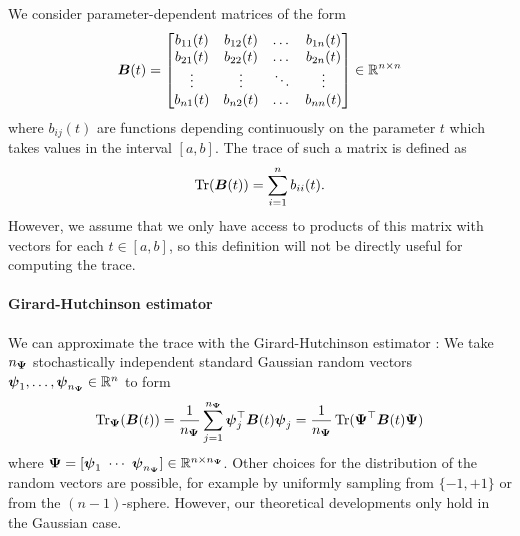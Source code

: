 \documentclass[12pt]{article}
\begin{document}
We consider parameter-dependent matrices of the form
\begin{equation}
    \boldsymbol{B}(t) = \begin{bmatrix}
        b_{11}(t) & b_{12}(t) & \dots & b_{1n}(t) \\
        b_{21}(t) & b_{22}(t) & \dots & b_{2n}(t) \\
        \vdots & \vdots & \ddots & \vdots \\
        b_{n1}(t) & b_{n2}(t) & \dots & b_{nn}(t) \\
    \end{bmatrix} \in \mathbb{R}^{n \times n}
\end{equation}
where $b_{ij}(t)$ are functions depending continuously on the parameter $t$ which takes values in the interval $[a,b]$. The trace of such a matrix is defined as
\begin{equation}
    \operatorname{Tr}(\boldsymbol{B}(t)) = \sum_{i=1}^{n} b_{ii}(t).
    \label{equ:definition-trace}
\end{equation}
However, we assume that we only have access to products of this matrix with vectors for each $t \in [a, b]$, so this definition will not be directly useful for computing the trace.

\paragraph{Girard-Hutchinson estimator} We can approximate the trace with the Girard-Hutchinson estimator \cite{girard-1989-fast-montecarlo,hutchinson-1990-stochastic-estimator}: We take $n_{\boldsymbol{\Psi}}$ stochastically independent standard Gaussian random vectors $\boldsymbol{\psi}_1,\dots, \boldsymbol{\psi}_{n_{\boldsymbol{\Psi}}} \in \mathbb{R}^{n}$ to form
\begin{equation}
    \operatorname{Tr}_{\boldsymbol{\Psi}}(\boldsymbol{B}(t))
    = \frac{1}{n_{\boldsymbol{\Psi}}} \sum_{j=1}^{n_{\boldsymbol{\Psi}}} \boldsymbol{\psi}_j^{\top} \boldsymbol{B}(t) \boldsymbol{\psi}_j
    = \frac{1}{n_{\boldsymbol{\Psi}}} \operatorname{Tr}( \boldsymbol{\Psi}^{\top} \boldsymbol{B}(t) \boldsymbol{\Psi})
    \label{equ:hutchinson-trace-estimator}
\end{equation}
where $\boldsymbol{\Psi} = [\boldsymbol{\psi}_1 ~ \cdots ~ \boldsymbol{\psi}_{n_{\boldsymbol{\Psi}}}] \in \mathbb{R}^{n \times n_{\boldsymbol{\Psi}}}$. Other choices for the distribution of the random vectors are possible, for example by uniformly sampling from $\{-1, +1\}$ or from the $(n-1)$-sphere. However, our theoretical developments only hold in the Gaussian case.
\end{document}
